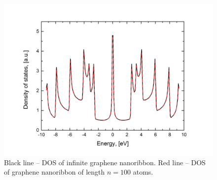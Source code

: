 \begin{figure}[h] 
\begin{center}
  \includegraphics[width=0.6\linewidth]{img/zz_ribbon_2_dos}
  \caption{Black line -- DOS of infinite graphene nanoribbon. Red line -- DOS of graphene nanoribbon of length $n=100$ atoms. \label{fig:1d_dos}}
\end{center}
\end{figure}


